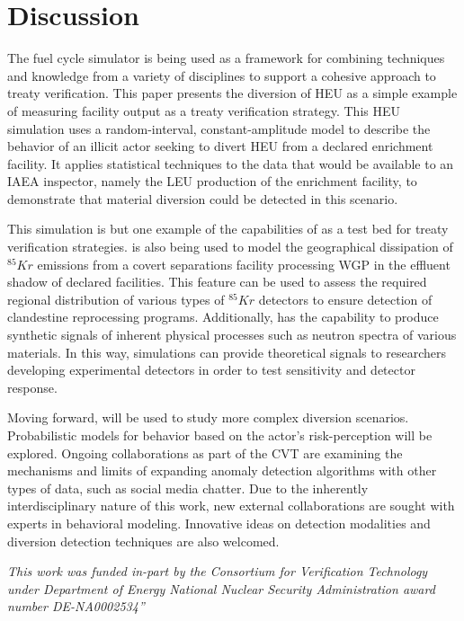 \section{Discussion}
\label{s_dis}

The \Cyclus fuel cycle simulator is being used as a framework for combining techniques and knowledge from a variety of disciplines to support a cohesive approach to treaty verification. This paper presents the diversion of \gls{HEU} as a simple example of measuring facility output as a treaty verification strategy.  This \gls{HEU} simulation uses a random-interval, constant-amplitude model to describe the behavior of an illicit actor seeking to divert \gls{HEU} from a declared enrichment facility.  It applies statistical techniques to the data that would be available to an \gls{IAEA} inspector, namely the \gls{LEU} production of the enrichment facility, to demonstrate that material diversion could be detected in this scenario.

This simulation is but one example of the capabilities of \Cyclus as a test bed for treaty verification strategies.  \Cyclus is also being used to model the geographical dissipation of $^{85}Kr$ emissions from a covert separations facility processing \gls{WGP} in the effluent shadow of declared facilities.  This feature can be used to assess the required regional distribution of various types of $^{85}Kr$ detectors to ensure detection of clandestine reprocessing programs.  Additionally, \Cyclus has the capability to produce synthetic signals of inherent physical processes such as neutron spectra of various materials.  In this way, \Cyclus simulations can provide theoretical signals to researchers developing experimental detectors in order to test sensitivity and detector response.

Moving forward, \Cyclus will be used to study more complex diversion scenarios.  Probabilistic models for behavior based on the actor's risk-perception will be explored.  Ongoing collaborations as part of the \gls{CVT} are examining the mechanisms and limits of expanding anomaly detection algorithms with other types of data, such as social media chatter.  Due to the inherently interdisciplinary nature of this work, new external collaborations are sought with experts in behavioral modeling. Innovative ideas on detection modalities and diversion detection techniques are also welcomed.



\textit{This work was funded in-part by the Consortium for Verification Technology under Department of Energy National Nuclear Security Administration award number DE-NA0002534”}
